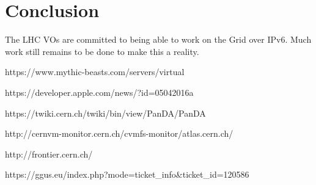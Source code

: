 \documentclass[11pt]{article}
\begin{document}
\section{Conclusion}
The LHC VOs are committed to being able to work on the Grid over IPv6.  Much work still remains to be done to make this a reality.  



\begin{thebibliography}{99}

 https://www.mythic-beasts.com/servers/virtual

 https://developer.apple.com/news/?id=05042016a

 https://twiki.cern.ch/twiki/bin/view/PanDA/PanDA

 http://cernvm-monitor.cern.ch/cvmfs-monitor/atlas.cern.ch/

 http://frontier.cern.ch/

 https://ggus.eu/index.php?mode=ticket\_info\&ticket\_id=120586

\end{thebibliography}
\end{document}
